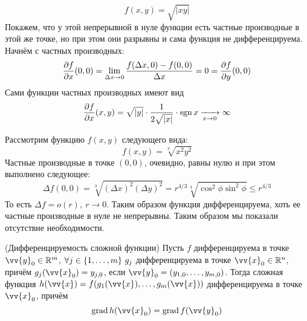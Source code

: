 \begin{example}
	\[
		f(x, y) = \sqrt{|xy|}
	\]
	Покажем, что у этой непрерывной в нуле функции есть частные производные в этой же точке, но при этом они разрывны и сама функция не дифференцируема. Начнём с частных производных:
	\[
		\frac{\partial f}{\partial x}(0, 0) = \lim\limits_{\Delta x \to 0} \frac{f(\Delta x, 0) - f(0, 0)}{\Delta x} = 0 = \frac{\partial f}{\partial y}(0, 0)
	\]
	Сами функции частных производных имеют вид
	\[
		\frac{\partial f}{\partial x}(x, y) = \sqrt{|y|} \cdot \frac{1}{2\sqrt{|x|}} \cdot \operatorname{sgn}{x} \xrightarrow[x \to 0]{} \infty
	\]
\end{example}
\begin{example}
	Рассмотрим функцию $f(x, y)$ следующего вида:
	\[
		f(x, y) = \sqrt[3]{x^2 y^2}
	\]
	Частные производные в точке $(0, 0)$, очевидно, равны нулю и при этом выполнено следующее:
	\[
		\Delta f(0, 0) = \sqrt[3]{(\Delta x)^2 (\Delta y)^2} = r^{4/3} \sqrt[3]{\cos^2 \phi \sin^2 \phi} \le r^{4/3}
	\]
	То есть $\Delta f = o(r),\ r \to 0$. Таким образом функция дифференцируема, хоть ее частные производные в нуле не непрерывны. Таким образом мы показали отсутствие необходимости.
\end{example}

\begin{theorem} (Дифференцируемость сложной функции)
	Пусть $f$ дифференцируема в точке $\vv{y}_0 \in \R^m$, $\forall j \in \range{m}\ g_j$ дифференцируема в точке $\vv{x}_0 \in \R^n$, причём $g_j(\vv{x}_0) = y_{j, 0}$, если $\vv{y}_0 = (y_{1, 0}, \ldots, y_{m, 0})$. Тогда сложная функция $h(\vv{x}) = f(g_1(\vv{x}), \ldots, g_m(\vv{x}))$ дифференцируема в точке $\vv{x}_0$, причём
	\[
		\grad h(\vv{x}_0) = \grad f(\vv{y}_0)
	\]
\end{theorem}


